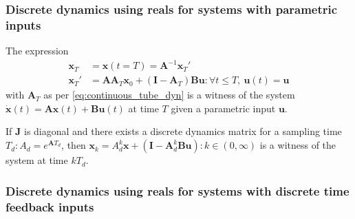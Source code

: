 \documentclass[sigconf]{llncs}
\newcommand{\mat}[1]{\boldsymbol{#1}}
\renewcommand{\vec}[1]{\boldsymbol{#1}}
\begin{document}
 \subsubsection{Discrete dynamics using reals for systems with parametric inputs}\label{sec:real_discrete_param_inputs}
\begin{theorem}
The expression
 \begin{align}
 \vec{x}_T&=\vec{x}(t=T)=\mat{A}^{-1}\vec{x}_T'\nonumber\\
\vec{x}_T'&=\mat{A}\mat{A}_T\vec{x}_0 + (\mat{I}-\mat{A}_T)\mat{B}\vec{u} : \forall t \leq T,\ \vec{u}(t)=\vec{u} 
 \end{align}
 with $\mat{A}_T$ as per \eqref{eq:continuous_tube_dyn} is a witness of the system $\dot{\vec{x}}(t)=\mat{A}\vec{x}(t)+\mat{B}\vec{u}(t)$ at time $T$ given a parametric input $\vec{u}$.
 \end{theorem}
 \begin{corollary}
 If $\mat{J}$ is diagonal and there exists a discrete dynamics matrix for a sampling time $T_d :  A_d=e^{\mat{A} T_d}$, then $\vec{x}_k=A_d^k\vec{x}+(\mat{I}-\mat{A}_d^k\mat{B}\vec{u}) : k \in (0,\infty)$ is a witness of the system at time $kT_d$.
 \end{corollary}

 \subsubsection{Discrete dynamics using reals for systems with discrete time feedback inputs}\label{sec:real_discrete_feedback_inputs}
\end{document}
